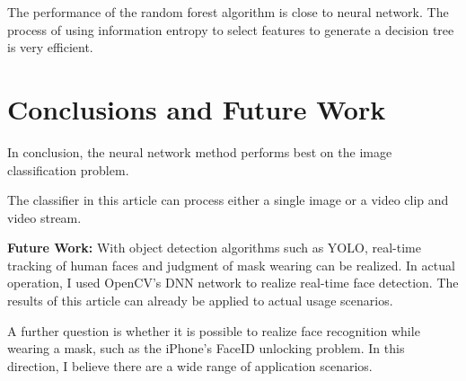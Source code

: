 \documentclass{article}
\begin{document}
  The performance of the random forest algorithm is close to neural network. The process of using information entropy to select features to generate a decision tree is very efficient.

\section{Conclusions and Future Work}
In conclusion, the neural network method performs best on the image classification problem.

The classifier in this article can process either a single image or a video clip and video stream.

\textbf{Future Work:}
With object detection algorithms such as YOLO, real-time tracking of human faces and judgment of mask wearing can be realized. In actual operation, I used OpenCV's DNN network to realize real-time face detection. The results of this article can already be applied to actual usage scenarios.

A further question is whether it is possible to realize face recognition while wearing a mask, such as the iPhone's FaceID unlocking problem. In this direction, I believe there are a wide range of application scenarios.



\end{document}
